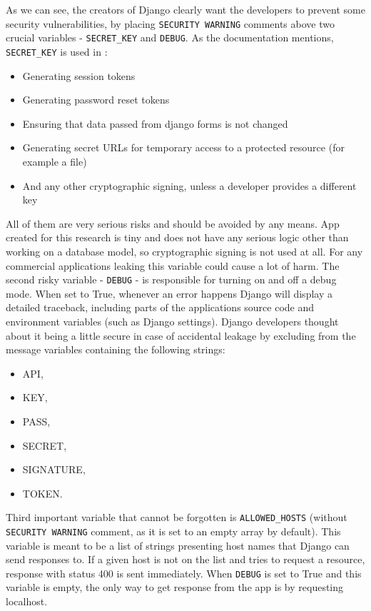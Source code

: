As we can see, the creators of Django clearly want the developers to prevent some security vulnerabilities, by placing \lstinline{SECURITY WARNING} comments above two crucial variables - \lstinline{SECRET_KEY} and \lstinline{DEBUG}.
As the documentation mentions, \lstinline{SECRET_KEY} is used in \cite{djangoSecretKey} \cite{djangoSigning}:
\begin{itemize}
      \item Generating session tokens
      \item Generating password reset tokens
      \item Ensuring that data passed from django forms is not changed
      \item Generating secret URLs for temporary access to a protected resource (for example a file)
      \item And any other cryptographic signing, unless a developer provides a different key 
\end{itemize}
All of them are very serious risks and should be avoided by any means. App created for this research is tiny and does not have any serious logic other than working on a database model, so cryptographic signing is not used at all. For any commercial applications leaking this variable could cause a lot of harm.
The second risky variable - \lstinline{DEBUG} - is responsible for turning on and off a debug mode. When set to True, whenever an error happens Django will display a detailed traceback, including parts of the applications source code and environment variables (such as Django settings).
Django developers thought about it being a little secure in case of accidental leakage by excluding from the message variables containing the following strings:
\begin{itemize}
      \item API,
      \item KEY,
      \item PASS,
      \item SECRET,
      \item SIGNATURE,
      \item TOKEN.
\end{itemize}



Third important variable that cannot be forgotten is \lstinline{ALLOWED_HOSTS} (without \lstinline{SECURITY WARNING} comment, as it is set to an empty array by default). This variable is meant to be a list of strings presenting host names that Django can send responses to. If a given host is not on the list and tries to request a resource, response with status 400 is sent immediately. When \lstinline{DEBUG} is set to True and this variable is empty, the only way to get response from the app is by requesting localhost.

